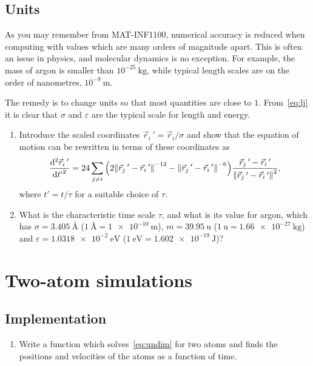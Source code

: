 \documentclass[11pt,british,a4paper]{report}
\begin{document}
\subsection{Units}
As you may remember from MAT-INF1100, numerical accuracy is reduced when computing with values which are many orders of magnitude apart. This is often an issue in physics, and molecular dynamics is no exception. For example, the mass of argon is smaller than \(10^{-25}\ \si{\kg}\), while typical length scales are on the order of nanometres, \(10^{-9}\ \si{\m}\).

The remedy is to change units so that most quantities are close to \(1\). From~\vref{eq:lj} it is clear that \(\sigma\) and \(\varepsilon\) are the typical scale for length and energy.

\begin{enumerate}[label=\roman*.]
    \item Introduce the scaled coordinates \(\vec{r}_i\,'=\vec{r}_i/\sigma\) and show that the equation of motion can be rewritten in terms of these coordinates as
    \begin{equation}
        \dv[2]{\vec{r}_i\,'}{{t'}} = 24 \sum_{j \neq i} \qty(2\norm{\vec{r}_j\,'-\vec{r}_i\,'}^{-12}-\norm{\vec{r}_j\,'-\vec{r}_i\,'}^{-6})\frac{\vec{r}_j\,'-\vec{r}_i\,'}{\norm{\vec{r}_j\,'-\vec{r}_i\,'}^2},\label{eq:undim}
    \end{equation}
    where \(t'=t/\tau\) for a suitable choice of \(\tau\).
    \item What is the characteristic time scale \(\tau\), and what is its value for argon, which has \(\sigma=\SI{3.405}{\angstrom}\) (\(\SI{1}{\angstrom}=\SI{1e-10}{\m}\)), \(m = \SI{39.95}{\atomicmassunit}\) (\(\SI{1}{\atomicmassunit} = \SI{1.66e-27}{\kg}\)) and \(\varepsilon=\SI{1.0318e-2}{\eV}\) (\(\SI{1}{\eV}=\SI{1.602e-19}{\J}\))?
\end{enumerate}



\section{Two-atom simulations}

\subsection{Implementation}
\begin{enumerate}[label=\roman*.]
    \item Write a function which solves~\vref{eq:undim} for two atoms and finds the positions and velocities of the atoms as a function of time.
\end{enumerate}
\end{document}
